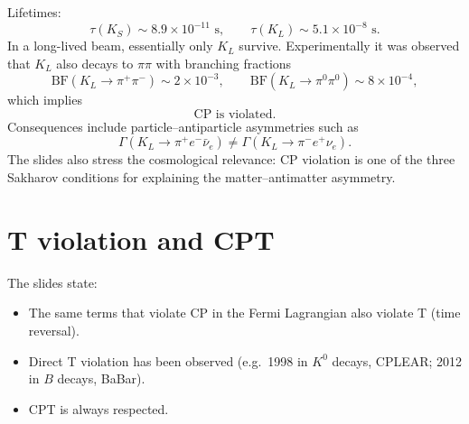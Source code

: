 Lifetimes:
\begin{equation}
\tau(K_S)\sim 8.9\times 10^{-11}\text{ s},
\qquad
\tau(K_L)\sim 5.1\times 10^{-8}\text{ s}.
\end{equation}
In a long-lived beam, essentially only $K_L$ survive. Experimentally it was observed that
$K_L$ also decays to $\pi\pi$ with branching fractions
\begin{equation}
\mathrm{BF}(K_L\to \pi^+\pi^-)\sim 2\times 10^{-3},
\qquad
\mathrm{BF}(K_L\to \pi^0\pi^0)\sim 8\times 10^{-4},
\end{equation}
which implies
\begin{equation}
\boxed{\text{CP is violated.}}
\end{equation}
Consequences include particle--antiparticle asymmetries such as
\begin{equation}
\Gamma(K_L\to \pi^+ e^- \bar\nu_e)\neq \Gamma(K_L\to \pi^- e^+ \nu_e).
\end{equation}
The slides also stress the cosmological relevance: CP violation is one of the three
Sakharov conditions for explaining the matter--antimatter asymmetry.

\section{T violation and CPT}
The slides state:
\begin{itemize}
  \item The same terms that violate CP in the Fermi Lagrangian also violate T (time reversal).
  \item Direct T violation has been observed (e.g.\ 1998 in $K^0$ decays, CPLEAR; 2012 in $B$ decays, BaBar).
  \item CPT is always respected.
\end{itemize}

